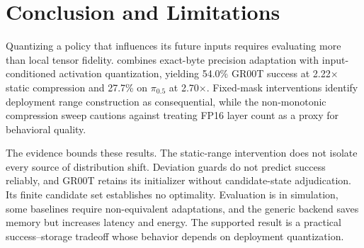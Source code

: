 \section{Conclusion and Limitations}
\label{sec:conclusion}

Quantizing a policy that influences its future inputs requires evaluating more than local tensor fidelity. \method combines exact-byte precision adaptation with input-conditioned activation quantization, yielding 54.0\% GR00T success at 2.22$\times$ static compression and 27.7\% on $\pi_{0.5}$ at 2.70$\times$. Fixed-mask interventions identify deployment range construction as consequential, while the non-monotonic compression sweep cautions against treating FP16 layer count as a proxy for behavioral quality.

The evidence bounds these results. The static-range intervention does not isolate every source of distribution shift. Deviation guards do not predict success reliably, and GR00T retains its initializer without candidate-state adjudication. Its finite candidate set establishes no optimality. Evaluation is in simulation, some baselines require non-equivalent adaptations, and the generic backend saves memory but increases latency and energy. The supported result is a practical success--storage tradeoff whose behavior depends on deployment quantization.
\label{sec:main-paper-end}

